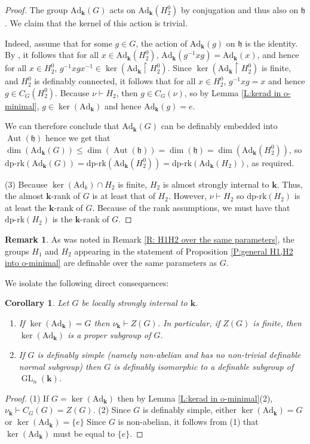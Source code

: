 \documentclass[11pt]{amsart}
\DeclareMathOperator{\gl}{GL} \DeclareMathOperator{\agl}{AGL}
\DeclareMathOperator{\aut}{Aut} \DeclareMathOperator{\id}{Id}
\newtheorem{corollary}[theorem]{Corollary}
\theoremstyle{definition}
\newtheorem{remark}[theorem]{Remark}
\newcommand{\bk}{\textbf{k}}
\newcommand{\0}{\emptyset}
\newcommand{\ad}{\mathrm{Ad}}
\def\dpr{\mathrm{dp\text{-}rk}}
\begin{document}
\begin{proof}
    The group $\ad_\bk(G)$ acts on $\ad_\bk(H_2^0)$ by conjugation and thus also on $\mathfrak{h}$. We claim that the kernel of this action is trivial.

Indeed, assume that for some $g\in G$, the action of $\ad_\bk(g)$ on $\mathfrak h$ is the identity. By \cite[Lemma 3.2(ii)]{OtPePi}, it follows that for all $x\in \ad_\bk(H_2^0)$, $\ad_\bk(g^{-1}xg)=\ad_\bk(x)$, and hence for all $x\in H_2^0$, $g^{-1}xgx^{-1}\in \ker(\ad_\bk\restriction H_2^0)$. Since $\ker(\ad_\bk\restriction H_2^0)$ is finite, and $H_2^0$ is definably connected, it follows that for all $x\in H_2^0$, $g^{-1}xg=x$ and hence $g\in C_G(H_2^0)$. 
Because $\nu \vdash H_2$, then $g\in C_G(\nu)$, so by Lemma \ref{L:kerad in o-minimal}, $g\in \ker(\ad_\bk)$ and hence $\ad_\bk(g)=e$.

    
    
    We can therefore conclude that  $\ad_\bk(G)$ can be definably embedded into $\aut(\mathfrak{h})$  hence we get that 
    $\dim(\ad_\bk(G))\leq \dim(\aut(\mathfrak{h}))=\dim(\mathfrak{h})=\dim(\ad_\bk(H_2^0))$, so $\dpr(\ad_\bk(G))=\dpr(\ad_{\bk}(H_2^0))=\dpr(\ad_\bk(H_2))$, as required. 

    (3)  Because $\ker(\ad_k)\cap H_2$ is finite,  $H_2$ is almost strongly internal to $\bk$. Thus, the almost $\bk$-rank of $G$ is at least that of $H_2$. However, $\nu\vdash H_2$ so  $\dpr(H_2)$ is at least the $\bk$-rank of $G$. Because of the rank assumptions, we must have that $\dpr(H_2)$ is the $\bk$-rank of $G$.
    \end{proof}

\begin{remark}
As was noted in Remark \ref{R: H1H2 over the same parameters}, the groups $H_1$ and $H_2$ appearing in the statement of Proposition \ref{P:general H1,H2 into o-minimal} are definable over the same parameters as $G$. 
\end{remark}


We isolate the following direct consequences:
\begin{corollary}
    Let $G$ be locally strongly internal to $\bk$.
    \begin{enumerate}
        \item If $\ker(\ad_\bk)=G$ then $\nu_\bk\vdash Z(G)$. In particular, if $Z(G)$ is finite, then $\ker(\ad_\bk)$ is a proper subgroup of $G$.
        \item If $G$ is definably simple (namely non-abelian and has no non-trivial definable normal subgroup) then $G$ is definably isomorphic to a definable subgroup of $\gl_n(\bk)$.
    \end{enumerate}
\end{corollary}
\begin{proof}
    (1) If $G=\ker(\ad_\bk)$ then by Lemma \ref{L:kerad in o-minimal}(2), $\nu_\bk\vdash C_G(G)=Z(G)$.
    (2) Since $G$ is definably simple, either $\ker(\ad_\bk)=G$ or $\ker(\ad_\bk)=\{e\}$ Since $G$ is non-abelian, it follows from (1) that $\ker(\ad_{\bk})$ must be equal to $\{e\}$. 
    \end{proof}
\end{document}
